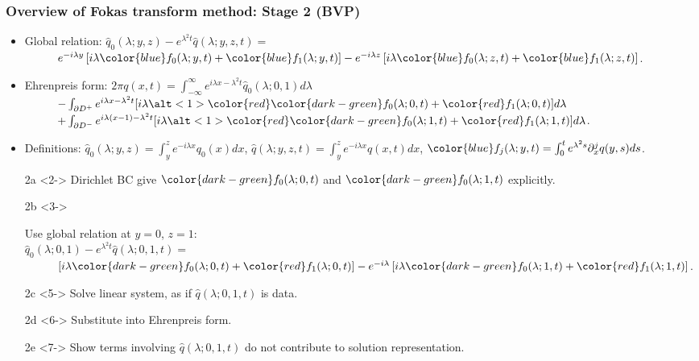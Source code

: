 \documentclass[10pt]{beamer}
\theoremstyle{definition}
\theoremstyle{remark}
\begin{document}
\begin{frame}[label=slide.FTM.Overview.2.BVP]
	\frametitle{Overview of Fokas transform method: Stage 2 (BVP)}
	\begin{itemize}
		\item{
			Global relation:
			$\hat{q}_0(\lambda;y,z) - e^{\lambda^2t}\hat{q}(\lambda;y,z,t) = $ \\
			~ $ \qquad e^{-i\lambda y}\left[i\lambda {\color{blue}f_0(\lambda;y,t)} + {\color{blue}f_1(\lambda;y,t)}\right] - e^{-i\lambda z}\left[i\lambda {\color{blue}f_0(\lambda;z,t)} + {\color{blue}f_1(\lambda;z,t)}\right]$.
		}
		\item{
			Ehrenpreis form:
			$2\pi q(x,t) = \int_{-\infty}^\infty e^{i\lambda x-\lambda^2t} \hat{q}_0(\lambda;0,1) d\lambda$ \\
			~ $\qquad - \int_{\partial D^+} e^{i\lambda x-\lambda^2t}[i\lambda {\alt<1>{\color{red}}{\color{dark-green}}f_0(\lambda;0,t)} + {\color{red}f_1(\lambda;0,t)}] d\lambda$ \\
			~ $\qquad + \int_{\partial D^-} e^{i\lambda (x-1)-\lambda^2t}[i\lambda {\alt<1>{\color{red}}{\color{dark-green}}f_0(\lambda;1,t)} + {\color{red}f_1(\lambda;1,t)}] d\lambda$.
		}
		\item{
			Definitions:
			$\hat{q}_0(\lambda;y,z) = \int_y^z e^{-i\lambda x} q_0(x) dx$,
			$\hat{q}(\lambda;y,z,t) = \int_y^z e^{-i\lambda x} q(x,t) dx$,
			${\color{blue}f_j(\lambda;y,t) = \int_0^t e^{\lambda^2s} \partial_x^jq(y,s) ds}$.
		}
	\end{itemize}
	\begin{enumerate}
		\item[2a]<2->{
			Dirichlet BC give ${\color{dark-green}f_0(\lambda;0,t)}$ and ${\color{dark-green}f_0(\lambda;1,t)}$ explicitly.
		}
		\item[2b]<3->{
			Use global relation at $y=0$, $z=1$: \\
			$\hat{q}_0(\lambda;0,1) - e^{\lambda^2t}\hat{q}(\lambda;0,1,t) =$ \\
			~ $\qquad\left[i\lambda {\color{dark-green}f_0(\lambda;0,t)} + {\color{red}f_1(\lambda;0,t)}\right]
			- e^{-i\lambda}\left[i\lambda {\color{dark-green}f_0(\lambda;1,t)} + {\color{red}f_1(\lambda;1,t)}\right]$.
				
		}
		\item[2c]<5->{
			Solve linear system, as if $\hat{q}(\lambda;0,1,t)$ is data.
		}
		\item[2d]<6->{
			Substitute into Ehrenpreis form.
		}
		\item[2e]<7->{
			Show terms involving $\hat{q}(\lambda;0,1,t)$ do not contribute to solution representation.
		}
	\end{enumerate}
		\vspace{80ex}
\end{frame}
\end{document}
